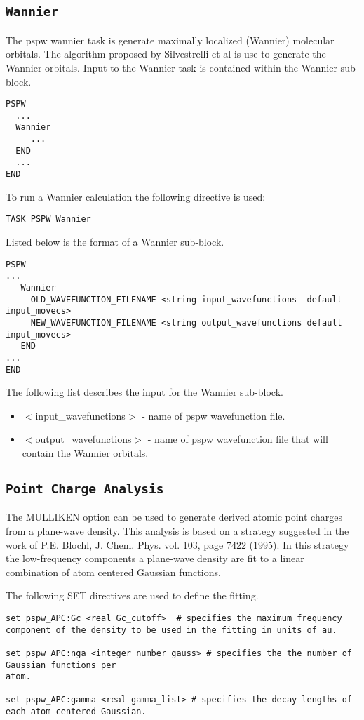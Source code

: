 \subsection{\tt Wannier}
\label{sec:pspw_wannier}
The pspw wannier task is generate maximally localized (Wannier) molecular orbitals.  The
algorithm proposed by Silvestrelli et al is use to generate the Wannier orbitals.
Input to the Wannier task is contained within the Wannier sub-block.
\begin{verbatim}
PSPW
  ...
  Wannier
     ...
  END
  ...
END
\end{verbatim}
To run a Wannier calculation the following directive 
is used:
\begin{verbatim}
TASK PSPW Wannier
\end{verbatim}
Listed below is the format of a Wannier sub-block.
\begin{verbatim}
PSPW
... 
   Wannier
     OLD_WAVEFUNCTION_FILENAME <string input_wavefunctions  default input_movecs>  
     NEW_WAVEFUNCTION_FILENAME <string output_wavefunctions default input_movecs>
   END
...
END
\end{verbatim}
The following list describes the input for the Wannier
sub-block.
\begin{itemize}
        \item $<$input\_wavefunctions$>$ - name of pspw wavefunction file.
        \item $<$output\_wavefunctions$>$ - name of pspw wavefunction file that
              will contain the Wannier orbitals. 
\end{itemize}




\subsection{\tt Point Charge Analysis}
\label{sec:pspw_point_charge_analysis}

The MULLIKEN option can be used to generate derived atomic point charges
from a plane-wave density.  This analysis is based on a strategy suggested in the work of
P.E. Blochl, J. Chem. Phys. vol. 103, page 7422 (1995).  In this strategy
the low-frequency components a plane-wave density are fit to a linear
combination of atom centered Gaussian functions.

The following SET directives are used to define the fitting.
\begin{verbatim}
set pspw_APC:Gc <real Gc_cutoff>  # specifies the maximum frequency component of the density to be used in the fitting in units of au.

set pspw_APC:nga <integer number_gauss> # specifies the the number of Gaussian functions per
atom.

set pspw_APC:gamma <real gamma_list> # specifies the decay lengths of each atom centered Gaussian. 
\end{verbatim}

